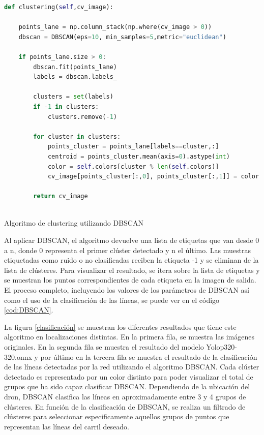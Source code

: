 \begin{code}[h]
  \begin{footnotesize}
  \begin{lstlisting}[language=Python]
    def clustering(self,cv_image):
    
    points_lane = np.column_stack(np.where(cv_image > 0))
    dbscan = DBSCAN(eps=10, min_samples=5,metric="euclidean")

    if points_lane.size > 0:
        dbscan.fit(points_lane)
        labels = dbscan.labels_

        clusters = set(labels)
        if -1 in clusters:
            clusters.remove(-1)
    
        for cluster in clusters:
            points_cluster = points_lane[labels==cluster,:]
            centroid = points_cluster.mean(axis=0).astype(int)
            color = self.colors[cluster % len(self.colors)]
            cv_image[points_cluster[:,0], points_cluster[:,1]] = color

        return cv_image
  
  \end{lstlisting}
  \caption[Algoritmo de custering utilizando DBSCAN]{Algoritmo de clustering utilizando DBSCAN}
  \label{cod:DBSCAN}
  \end{footnotesize}
  \end{code}  


Al aplicar DBSCAN, el algoritmo devuelve una lista de etiquetas que van desde 0 a n, 
donde 0 representa el primer clúster detectado y n el último. Las muestras etiquetadas como ruido o no clasificadas reciben la etiqueta -1 y se eliminan de la lista de clústeres. Para visualizar 
el resultado, se itera sobre la lista de etiquetas y se muestran los puntos correspondientes de cada etiqueta en la imagen de salida. El proceso completo, incluyendo los valores 
de los parámetros de DBSCAN así como el uso de la clasificación de las líneas, se puede ver en el código \ref{cod:DBSCAN}. \newline

La figura \ref{clasificación} se muestran los diferentes resultados que tiene este algoritmo en localizaciones distintas. En la primera fila, se muestra las imágenes originales. En la segunda 
fila se muestra el resultado del modelo Yolop320-320.onnx y por último en la tercera fila se muestra el resultado de la clasificación de las líneas detectadas por la red 
utilizando el algoritmo DBSCAN. Cada clúster detectado es representado por un color distinto para poder visualizar el total de grupos que ha sido capaz clasificar DBSCAN.
Dependiendo de la ubicación del dron, DBSCAN clasifica las líneas en aproximadamente entre 3 y 4 grupos de clústeres. En función de la clasificación de DBSCAN, se realiza 
un filtrado de clústeres para seleccionar especificamente aquellos grupos de puntos que representan las líneas del carril deseado.

